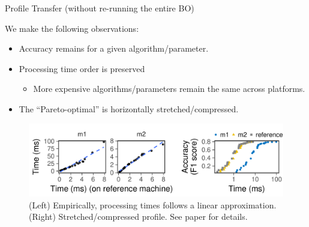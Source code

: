 \begin{frame}[t]{Profile Transfer (without re-running the entire BO)}
  \vspace{1em}

  We make the following observations:

  \begin{itemize}
    \pause
  \item Accuracy remains for a given algorithm/parameter.
    \pause
  \item Processing time order is preserved
    \begin{itemize}
    \item More expensive algorithms/parameters remain the same across platforms.
    \end{itemize}
    \pause
  \item The ``Pareto-optimal'' is horizontally stretched/compressed.
  \end{itemize}
  \pause
  \begin{figure}
    \centering
    \includegraphics[width=0.95\linewidth]{figures/serving-cross-platform.pdf}
    \caption{(Left) Empirically, processing times follows a linear
      approximation. (Right) Stretched/compressed profile. See paper for
      details.}
  \end{figure}
\end{frame}

